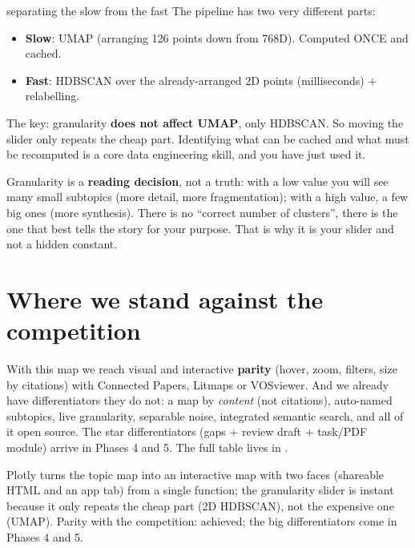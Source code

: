 \documentclass[11pt,a4paper]{article}
\begin{document}
\begin{concepto}{separating the slow from the fast}
The pipeline has two very different parts:
\begin{itemize}
  \item \textbf{Slow}: UMAP (arranging 126 points down from 768D). Computed ONCE and cached.
  \item \textbf{Fast}: HDBSCAN over the already-arranged 2D points (milliseconds) $+$ relabelling.
\end{itemize}
The key: granularity \textbf{does not affect UMAP}, only HDBSCAN. So moving the slider only
repeats the cheap part. Identifying what can be cached and what must be recomputed is a core
data engineering skill, and you have just used it.
\end{concepto}

\begin{ojo}
Granularity is a \textbf{reading decision}, not a truth: with a low value you will see many
small subtopics (more detail, more fragmentation); with a high value, a few big ones (more
synthesis). There is no ``correct number of clusters'', there is the one that best tells the
story for your purpose. That is why it is your slider and not a hidden constant.
\end{ojo}

\section{Where we stand against the competition}

With this map we reach visual and interactive \textbf{parity} (hover, zoom, filters, size by
citations) with Connected Papers, Litmaps or VOSviewer. And we already have differentiators
they do not: a map by \emph{content} (not citations), auto-named subtopics, live granularity,
separable noise, integrated semantic search, and all of it open source. The star
differentiators (gaps $+$ review draft $+$ task/PDF module) arrive in Phases 4 and 5. The full
table lives in .

\begin{resumen}
Plotly turns the topic map into an interactive map with two faces (shareable HTML and an app
tab) from a single function; the granularity slider is instant because it only repeats the
cheap part (2D HDBSCAN), not the expensive one (UMAP). Parity with the competition: achieved;
the big differentiators come in Phases 4 and 5.
\end{resumen}
\end{document}
